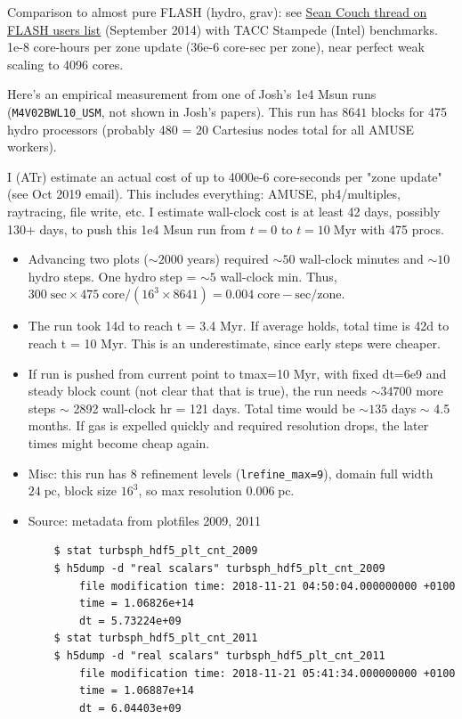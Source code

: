 \documentclass[10pt]{article}
\newcommand*{\mt}{\mathrm}
\newcommand*{\unit}[1]{\;\mt{#1}}  %
\begin{document}
Comparison to almost pure FLASH (hydro, grav):
see \href{http://flash.uchicago.edu/pipermail/flash-users/2014-September/001525.html}{Sean Couch thread on FLASH users list}
(September 2014) with TACC Stampede (Intel) benchmarks.  1e-8 core-hours per
zone update (36e-6 core-sec per zone), near perfect weak scaling to 4096
cores.

Here's an empirical measurement from one of Josh's 1e4 Msun runs
(\texttt{M4V02BWL10\_USM}, not shown in Josh's papers).
This run has $8641$ blocks for 475 hydro processors (probably 480 = 20
Cartesius nodes total for all AMUSE workers).

I (ATr) estimate an actual cost of up to 4000e-6 core-seconds per "zone update"
(see Oct 2019 email).  This includes everything: AMUSE, ph4/multiples,
raytracing, file write, etc.
I estimate wall-clock cost is at least 42 days, possibly 130+ days, to push
this 1e4 Msun run from $t=0$ to $t=10 \unit{Myr}$ with 475 procs.

\begin{itemize}
    \item Advancing two plots ($\sim2000$ years) required $\sim50$ wall-clock
        minutes and $\sim10$ hydro steps.  One hydro step = $\sim5$ wall-clock min.
        Thus, $300 \unit{sec} \times 475 \unit{core}/(16^3 \times 8641) = 0.004 \unit{core-sec/zone}$.
    \item The run took 14d to reach t = 3.4 Myr.
        If average holds, total time is 42d to reach t = 10 Myr.
        This is an underestimate, since early steps were cheaper.
    \item If run is pushed from current point to tmax=10 Myr, with fixed dt=6e9 and
        steady block count (not clear that that is true), the run needs $\sim34700$ more
        steps $\sim$ 2892 wall-clock hr = 121 days.
        Total time would be $\sim135$ days $\sim$ 4.5 months.
        If gas is expelled quickly and required resolution drops, the later times might become cheap again.
    \item Misc: this run has 8 refinement levels (\texttt{lrefine\_max=9}),
        domain full width $24\unit{pc}$, block size $16^3$, so max resolution
        $0.006\unit{pc}$.
    \item Source: metadata from plotfiles 2009, 2011
\begin{verbatim}
    $ stat turbsph_hdf5_plt_cnt_2009
    $ h5dump -d "real scalars" turbsph_hdf5_plt_cnt_2009
        file modification time: 2018-11-21 04:50:04.000000000 +0100
        time = 1.06826e+14
        dt = 5.73224e+09
    $ stat turbsph_hdf5_plt_cnt_2011
    $ h5dump -d "real scalars" turbsph_hdf5_plt_cnt_2011
        file modification time: 2018-11-21 05:41:34.000000000 +0100
        time = 1.06887e+14
        dt = 6.04403e+09
\end{verbatim}
\end{itemize}
\end{document}
